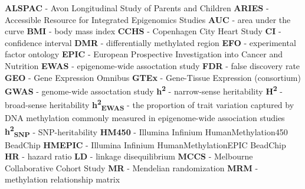 \documentclass[11pt,oneside]{bristolthesis}
\begin{document}
  \begin{abbreviations}
    \textbf{ALSPAC} - Avon Longitudinal Study of Parents and Children \newline
    \textbf{ARIES} - Accessible Resource for Integrated Epigenomics Studies \newline
    \textbf{AUC} - area under the curve \newline
    \textbf{BMI} - body mass index \newline
    \textbf{CCHS} - Copenhagen City Heart Study \newline
    \textbf{CI} - confidence interval \newline
    \textbf{DMR} - differentially methylated region \newline
    \textbf{EFO} - experimental factor ontology \newline
    \textbf{EPIC} - European Prospective Investigation into Cancer and Nutrition \newline
    \textbf{EWAS} - epigenome-wide assoctation study \newline
    \textbf{FDR} - false discovery rate \newline
    \textbf{GEO} - Gene Expression Omnibus \newline
    \textbf{GTEx} - Gene-Tissue Expression (consortium) \newline
    \textbf{GWAS} - genome-wide assoctation study \newline
    \textbf{h\textsuperscript{2}} - narrow-sense heritability \newline
    \textbf{H\textsuperscript{2}} - broad-sense heritability \newline
    \textbf{h\textsuperscript{2}\textsubscript{EWAS}} - the proportion of trait variation captured by DNA methylation commonly measured in epigenome-wide association studies \newline
    \textbf{h\textsuperscript{2}\textsubscript{SNP}} - SNP-heritability \newline
    \textbf{HM450} - Illumina Infinium HumanMethylation450 BeadChip \newline
    \textbf{HMEPIC} - Illumina Infinium HumanMethylationEPIC BeadChip \newline
    \textbf{HR} - hazard ratio
    \textbf{LD} - linkage disequilibrium \newline
    \textbf{MCCS} - Melbourne Collaborative Cohort Study \newline
    \textbf{MR} - Mendelian randomization \newline
    \textbf{MRM} - methylation relationship matrix \newline

\end{abbreviations}
\end{document}
